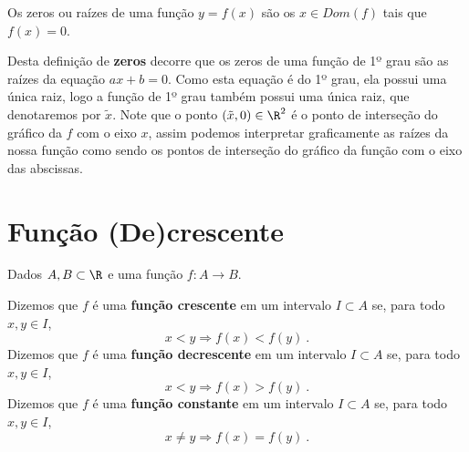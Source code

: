  \vskip0.3cm
 \colorbox{azul}{
 \begin{minipage}{0.9\linewidth}
 \begin{center}
 Os zeros ou raízes de uma função $y= f(x)$ são os $x \in Dom(f)$ tais que $f(x)= 0$.
 \end{center}
 \end{minipage}}
 \vskip0.3cm

 Desta definição de \textbf{zeros} decorre que os zeros de uma função de 1º grau são as raízes da equação $ax+b=0$. Como esta equação é do 1º grau, ela possui uma única raiz, logo a função de 1º grau também possui uma única raiz, que denotaremos por $\tilde{x}$. Note que o ponto $(\tilde{x}, 0) \in \R^2$ é o ponto de interseção do gráfico da $f$ com o eixo $x$, assim podemos interpretar graficamente as raízes da nossa função como sendo os pontos de interseção do gráfico da função com o eixo das abscissas.

\section{Função (De)crescente}

   \vskip0.3cm
 \colorbox{azul}{
 \begin{minipage}{0.9\linewidth}
 \begin{center}
  Dados $A, B \subset \R$ e uma função $f: A \rightarrow B$.

  Dizemos que $f$ é uma \textbf{função crescente} em um intervalo $I \subset A$ se, para todo $x, y \in I$,
\begin{equation}
 x < y \Rightarrow f(x) < f(y) \ .
\end{equation}
  Dizemos que $f$ é uma \textbf{função decrescente} em um intervalo $I \subset A$ se, para todo $x, y \in I$,
\begin{equation}
x < y \Rightarrow f(x) > f(y) \ .
\end{equation}
  Dizemos que $f$ é uma \textbf{função constante} em um intervalo $I \subset A$ se, para todo $x, y \in I$,
\begin{equation}
x \neq y \Rightarrow f(x) = f(y) \ .
\end{equation}
 \end{center}
 \end{minipage}}
 \vskip0.3cm

